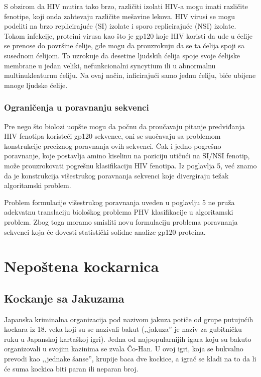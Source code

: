 S obzirom da HIV mutira tako brzo, različiti izolati HIV-a mogu imati različite fenotipe, koji onda zahtevaju različite mešavine lekova. HIV virusi se mogu podeliti na brzo replicirajuće (SI) izolate i sporo replicirajuće (NSI) izolate. Tokom infekcije, proteini virusa kao što je gp120 koje HIV koristi da uđe u ćelije se prenose do površine ćelije, gde mogu da prouzrokuju da se ta ćelija spoji sa susednom ćelijom. To uzrokuje da desetine ljudskih ćelija spoje svoje ćelijske membrane u jedan veliki, nefunkcionalni syncytium ili u abnormalnu multinukleaturnu ćeliju. Na ovaj način, inficirajući samo jednu ćeliju, biće ubijene mnoge ljudske ćelije.

\subsubsection{Ograničenja u poravnanju sekvenci}

Pre nego što biolozi uopšte mogu da počnu da proučavaju pitanje predviđanja HIV fenotipa koristeći gp120 sekvence, oni se suočavaju sa problemom konstrukcije preciznog poravnanja ovih sekvenci. Čak i jedno pogrešno poravnanje, koje postavlja amino kiselinu na poziciju utičući na SI/NSI fenotip, može prouzrokovati pogrešnu klasifikaciju HIV fenotipa. Iz poglavlja 5, već znamo da je konstrukcija višestrukog poravnanja sekvenci koje divergiraju težak algoritamski problem. 

Problem formulacije višestrukog poravnanja uveden u poglavlju 5 ne pruža adekvatnu translaciju biološkog problema PHV klasifikacije u algoritamski problem. Zbog toga moramo smisliti novu formulaciju problema poravnanja sekvenci koja će dovesti statistički solidne analize gp120 proteina.


\section{Nepoštena kockarnica}
\subsection{Kockanje sa Jakuzama}
Japanska kriminalna organizacija pod nazivom jakuza potiče od grupe putujućih kockara iz 18. veka koji su se nazivali bakut (‚‚jakuza'' je naziv za gubitničku ruku u Japanskoj kartaškoj igri). Jedna od najpopularnijih igara koju su bakuto organizovali u svojim kazinima se zvala Čo-Han. U ovoj igri, koja se bukvalno prevodi kao ‚‚jednake šanse'', krupije baca dve kockice, a igrač se kladi na to da li će suma kockica biti paran ili neparan broj.

